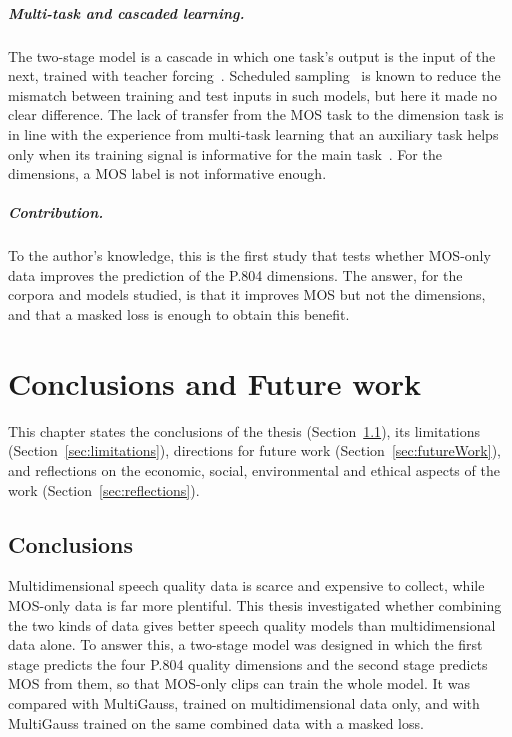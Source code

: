 \documentclass[
english,                 %
bibtex,                  %
includeExtraAbstracts, %
]{kththesis}
\numberwithin{listing}{chapter}
\begin{document}
\paragraph{Multi-task and cascaded learning.} The two-stage model is a cascade in which one task's output is the input of the next, trained with teacher forcing~\cite{williams_zipser_1989}. Scheduled sampling~\cite{bengio_scheduled_2015} is known to reduce the mismatch between training and test inputs in such models, but here it made no clear difference. The lack of transfer from the MOS task to the dimension task is in line with the experience from multi-task learning that an auxiliary task helps only when its training signal is informative for the main task~\cite{caruana_multitask_1997}. For the dimensions, a MOS label is not informative enough.

\paragraph{Contribution.} To the author's knowledge, this is the first study that tests whether MOS-only data improves the prediction of the P.804 dimensions. The answer, for the corpora and models studied, is that it improves MOS but not the dimensions, and that a masked loss is enough to obtain this benefit.

\cleardoublepage
\chapter{Conclusions and Future work}
\label{ch:conclusionsAndFutureWork}

This chapter states the conclusions of the thesis (Section~\ref{sec:conclusions}), its limitations (Section~\ref{sec:limitations}), directions for future work (Section~\ref{sec:futureWork}), and reflections on the economic, social, environmental and ethical aspects of the work (Section~\ref{sec:reflections}).

\section{Conclusions}
\label{sec:conclusions}

Multidimensional speech quality data is scarce and expensive to collect, while MOS-only data is far more plentiful. This thesis investigated whether combining the two kinds of data gives better speech quality models than multidimensional data alone. To answer this, a two-stage model was designed in which the first stage predicts the four P.804 quality dimensions and the second stage predicts MOS from them, so that MOS-only clips can train the whole model. It was compared with MultiGauss, trained on multidimensional data only, and with MultiGauss trained on the same combined data with a masked loss.
\end{document}
